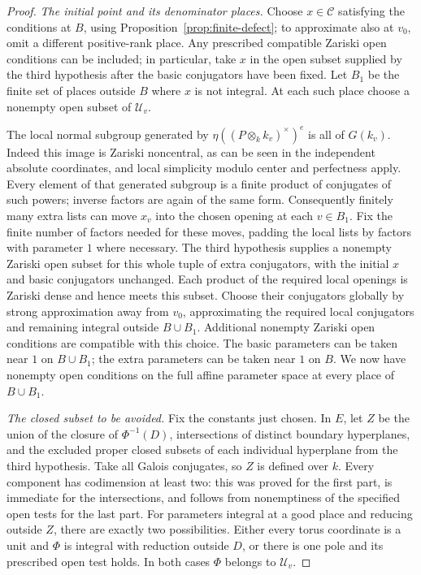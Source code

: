 \begin{proof}
\emph{The initial point and its denominator places.}
Choose \(x\in\mathcal C\) satisfying the conditions at \(B\), using
Proposition~\ref{prop:finite-defect}; to approximate also at \(v_0\),
omit a different positive-rank place.  Any prescribed compatible
Zariski open conditions can be included; in particular, take \(x\)
in the open subset supplied by the third hypothesis after the
basic conjugators have been fixed.  Let \(B_1\) be the finite
set of places outside \(B\) where \(x\) is not integral.
At each such place choose a nonempty open subset of \(\mathcal U_v\).

The local normal subgroup generated by
\(\eta((P\otimes_k k_v)^\times)^e\) is all of \(G(k_v)\).
Indeed this image is Zariski noncentral, as can be seen in the
independent absolute coordinates, and local simplicity modulo center
and perfectness apply.  Every element of that generated subgroup
is a finite product of conjugates of such powers; inverse factors
are again of the same form.  Consequently finitely many extra
lists can move \(x_v\) into the chosen opening at each \(v\in B_1\).
Fix the finite number of factors needed for these moves, padding
the local lists by factors with parameter \(1\) where necessary.
The third hypothesis supplies a nonempty Zariski open subset for
this whole tuple of extra conjugators, with the initial \(x\)
and basic conjugators unchanged.  Each product of the required
local openings is Zariski dense and hence meets this subset.
Choose their conjugators globally by strong approximation away from
\(v_0\), approximating the required local conjugators and remaining
integral outside \(B\cup B_1\).  Additional nonempty Zariski open
conditions are compatible with this choice.
The basic parameters can be taken near \(1\) on \(B\cup B_1\);
the extra parameters can be taken near \(1\) on \(B\).  We now have
nonempty open conditions on the full affine parameter space at
every place of \(B\cup B_1\).

\emph{The closed subset to be avoided.}
Fix the constants just chosen.  In \(E\), let \(Z\) be the union of
the closure of \(\Phi^{-1}(D)\), intersections of distinct boundary
hyperplanes, and the excluded proper closed subsets of each
individual hyperplane from the third hypothesis.
Take all Galois conjugates, so \(Z\) is defined over \(k\).
Every component has codimension at least two: this was proved for
the first part, is immediate for the intersections, and follows
from nonemptiness of the specified open tests for the last part.
For parameters integral at a good place and reducing outside \(Z\),
there are exactly two possibilities.  Either every torus coordinate
is a unit and \(\Phi\) is integral with reduction outside \(D\), or
there is one pole and its prescribed open test holds.  In both cases
\(\Phi\) belongs to \(\mathcal U_v\).


\end{proof}
